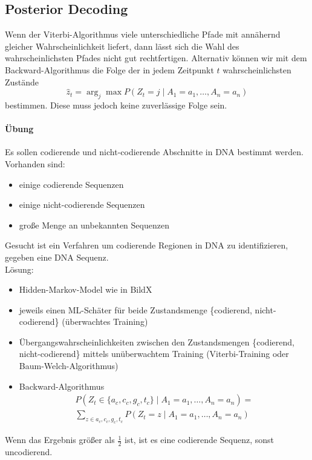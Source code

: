 \subsection{Posterior Decoding}
Wenn der Viterbi-Algorithmus viele unterschiedliche Pfade mit annähernd gleicher Wahrscheinlichkeit liefert, dann lässt sich die Wahl des wahrscheinlichsten Pfades nicht gut rechtfertigen.
Alternativ können wir mit dem Backward-Algorithmus die Folge der in jedem
Zeitpunkt $t$ wahrscheinlichsten Zustände
\[ \hat z_{t} = \arg_{j}\max P(Z_{t} = j \mid  A_{1} = a_{1}, \ldots, A_{n} = a_{n}) \]
bestimmen.
Diese muss jedoch keine zuverlässige Folge sein.

\begin{shaded}
\paragraph{Übung}
\label{par:ubung}

Es sollen codierende und nicht-codierende Abschnitte in DNA bestimmt werden.
Vorhanden sind:
\begin{itemize}
    \item einige codierende Sequenzen
    \item einige nicht-codierende Sequenzen
    \item große Menge an unbekannten Sequenzen
\end{itemize}
Gesucht ist ein Verfahren um codierende Regionen in DNA zu identifizieren,
gegeben eine DNA Sequenz.\\
Lösung:
\begin{itemize}
    \item Hidden-Markov-Model wie in BildX
    \item jeweils einen ML-Schäter für beide Zustandsmenge \{codierend,
        nicht-codierend\} (überwachtes Training)
    \item Übergangswahrscheinlichkeiten zwischen den Zustandsmengen \{codierend,
        nicht-codierend\} mittels unüberwachtem Training (Viterbi-Training oder
        Baum-Welch-Algorithmus)
    \item Backward-Algorithmus
        \begin{align*}
            P(Z_t \in \{a_c,c_c,g_c,t_c\} \mid  A_1=a_1,\ldots,A_n=a_n)=\\
            \sum\limits_{z\in a_c,c_c,g_c,t_c} P(Z_t=z\mid A_1=a_1,\ldots,A_n=a_n)
        \end{align*}
\end{itemize}
Wenn das Ergebnis größer als $\frac{1}{2}$ ist, ist es eine codierende Sequenz,
sonst uncodierend.
\end{shaded}


